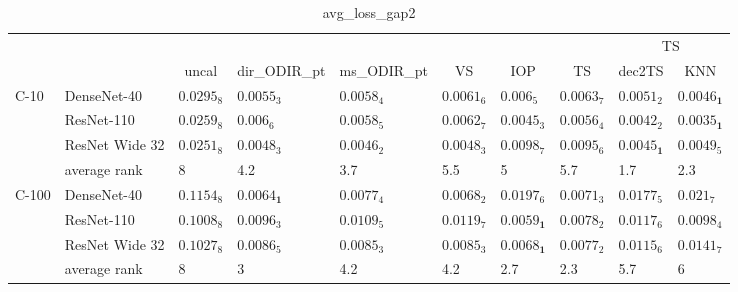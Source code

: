 \begin{table*}
\caption{avg_loss_gap2}
\label{table:avg_loss_gap2}
\centering
\begin{adjustbox}{width=\textwidth}

\begin{tabular}{llllllllll}
\toprule
\multicolumn{8}{c}{}&\multicolumn{2}{c}{TS}\\
\cmidrule{9-10}
\multicolumn{1}{c}{}&\multicolumn{1}{c}{}&\multicolumn{1}{c}{uncal}&\multicolumn{1}{c}{dir_ODIR_pt}&\multicolumn{1}{c}{ms_ODIR_pt}&\multicolumn{1}{c}{VS}&\multicolumn{1}{c}{IOP}&\multicolumn{1}{c}{TS}&\multicolumn{1}{c}{dec2TS}&\multicolumn{1}{c}{KNN}\\\midrule
C-10 & DenseNet-40 &  $0.0295_{8}$ &           $0.0055_{3}$ &  $0.0058_{4}$ &  $0.0061_{6}$ &            $0.006_{5}$ &  $0.0063_{7}$ &           $0.0051_{2}$ &  $\mathbf{0.0046_{1}}$ \\
      & ResNet-110 &  $0.0259_{8}$ &            $0.006_{6}$ &  $0.0058_{5}$ &  $0.0062_{7}$ &           $0.0045_{3}$ &  $0.0056_{4}$ &           $0.0042_{2}$ &  $\mathbf{0.0035_{1}}$ \\
      & ResNet Wide 32 &  $0.0251_{8}$ &           $0.0048_{3}$ &  $0.0046_{2}$ &  $0.0048_{3}$ &           $0.0098_{7}$ &  $0.0095_{6}$ &  $\mathbf{0.0045_{1}}$ &           $0.0049_{5}$ \\
\cmidrule{2-10}
      & average rank &             8 &                    4.2 &           3.7 &           5.5 &                      5 &           5.7 &                    1.7 &                    2.3 \\
\cmidrule{1-10}
C-100 & DenseNet-40 &  $0.1154_{8}$ &  $\mathbf{0.0064_{1}}$ &  $0.0077_{4}$ &  $0.0068_{2}$ &           $0.0197_{6}$ &  $0.0071_{3}$ &           $0.0177_{5}$ &            $0.021_{7}$ \\
      & ResNet-110 &  $0.1008_{8}$ &           $0.0096_{3}$ &  $0.0109_{5}$ &  $0.0119_{7}$ &  $\mathbf{0.0059_{1}}$ &  $0.0078_{2}$ &           $0.0117_{6}$ &           $0.0098_{4}$ \\
      & ResNet Wide 32 &  $0.1027_{8}$ &           $0.0086_{5}$ &  $0.0085_{3}$ &  $0.0085_{3}$ &  $\mathbf{0.0068_{1}}$ &  $0.0077_{2}$ &           $0.0115_{6}$ &           $0.0141_{7}$ \\
\cmidrule{2-10}
      & average rank &             8 &                      3 &           4.2 &           4.2 &                    2.7 &           2.3 &                    5.7 &                      6 \\
\bottomrule
\end{tabular}


\end{adjustbox}
\end{table*}
